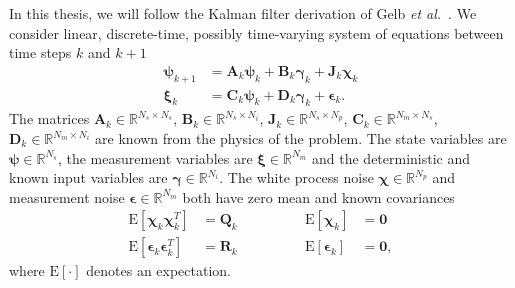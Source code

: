 In this thesis, we will follow the Kalman filter derivation of Gelb \textit{et al.}~\cite{Gelb1974a}. We consider linear, discrete-time, possibly time-varying system of equations between time steps $k$ and $k+1$ 
\begin{align}
\label{eq:linear_plant1}
\boldsymbol{\psi}_{k+1} &= \mathbf{A}_k \boldsymbol{\psi}_k + \mathbf{B}_k \boldsymbol{\gamma}_k + \mathbf{J}_k\boldsymbol{\chi}_k \\
\label{eq:linear_plant2}
\boldsymbol{\xi}_k &= \mathbf{C}_k\boldsymbol{\psi}_k + \mathbf{D}_k\boldsymbol{\gamma}_k + \boldsymbol{\epsilon}_k.
\end{align}
The matrices $\mathbf{A}_k \in \mathbb{R}^{N_s \times N_s}$, $\mathbf{B}_k \in \mathbb{R}^{N_s \times N_i}$, $\mathbf{J}_k \in \mathbb{R}^{N_s \times N_p}$, $\mathbf{C}_k \in \mathbb{R}^{N_m \times N_s}$, $\mathbf{D}_k \in \mathbb{R}^{N_m \times N_i}$ are known from the physics of the problem. The state variables are $\boldsymbol{\psi} \in \mathbb{R}^{N_s}$, the measurement variables are $\boldsymbol{\xi} \in \mathbb{R}^{N_m}$ and the deterministic and known input variables are $\boldsymbol{\gamma} \in \mathbb{R}^{N_i}$. The white process noise $\boldsymbol{\chi} \in \mathbb{R}^{N_p}$ and measurement noise $\boldsymbol{\epsilon} \in \mathbb{R}^{N_m}$ both have zero mean and known covariances
\begin{align}
\mathrm{E}[\boldsymbol{\chi}_k \boldsymbol{\chi}_k^T] &= \mathbf{Q}_k \qquad \qquad& \mathrm{E}[\boldsymbol{\chi}_k] &= \mathbf{0} \\
\mathrm{E}[\boldsymbol{\epsilon}_k \boldsymbol{\epsilon}_k^T] &= \mathbf{R}_k \qquad \qquad & \mathrm{E}[\boldsymbol{\epsilon}_k] &= \mathbf{0},
\end{align}
where $\mathrm{E}[\cdot]$ denotes an expectation. 

